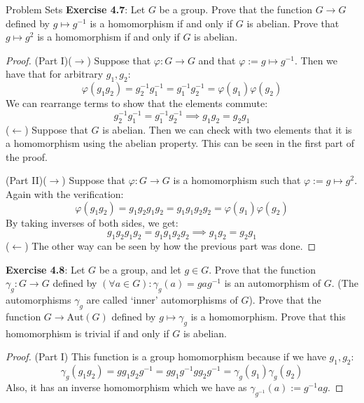 \documentclass{report}
\begin{document}
\begin{exercises}{Problem Sets}
    \textbf{Exercise 4.7}: Let $G$ be a group. Prove that the function $G \rightarrow G$ defined by $g \mapsto g^{-1}$ is a homomorphism if and only if $G$ is abelian. Prove that $g \mapsto g^{2}$ is a homomorphism if and only if $G$ is abelian.
        \begin{proof}
            (Part I)($\rightarrow $) Suppose that $\varphi : G \rightarrow G$ and that $\varphi := g \mapsto g^{-1}$. Then we have that for arbitrary $g_{1}, g_{2}$:
                \begin{equation*}
                    \varphi(g_{1}g_{2}) = g_{2}^{-1}g_{1}^{-1} = g_{1}^{-1}g_{2}^{-1} = \varphi(g_{1})\varphi(g_{2})
                \end{equation*}
            We can rearrange terms to show that the elements commute:
                \begin{equation*}
                    g_{2}^{-1}g_{1}^{-1} = g_{1}^{-1}g_{2}^{-1} \implies g_{1}g_{2} = g_{2}g_{1}
                \end{equation*}
            ($\leftarrow $) Suppose that $G$ is abelian. Then we can check with two elements that it is a homomorphism using the abelian property. This can be seen in the first part of the proof.

            (Part II)($\rightarrow $) Suppose that $\varphi : G \rightarrow G$ is a homomorphism such that $\varphi := g \mapsto g^{2}$. Again with the verification:
                \begin{equation*}
                    \varphi(g_{1}g_{2}) = g_{1}g_{2}g_{1}g_{2} = g_{1}g_{1}g_{2}g_{2} = \varphi(g_{1})\varphi(g_{2})
                \end{equation*}
            By taking inverses of both sides, we get:
                \begin{equation*}
                    g_{1}g_{2}g_{1}g_{2} = g_{1}g_{1}g_{2}g_{2} \implies g_{1}g_{2} = g_{2}g_{1}
                \end{equation*}
            ($\leftarrow $) The other way can be seen by how the previous part was done.
        \end{proof}

    \textbf{Exercise 4.8}: Let $G$ be a group, and let $g \in G$. Prove that the function $\gamma_{g} : G \rightarrow G$ defined by $(\forall a \in G) : \gamma_{g}(a) = gag^{-1}$ is an automorphism of $G$. (The automorphisms $\gamma_{g}$ are called `inner' automorphisms of $G$). Prove that the function $G \rightarrow \text{Aut}(G)$ defined by $g \mapsto \gamma_{g}$ is a homomorphism. Prove that this homomorphism is trivial if and only if $G$ is abelian.
        \begin{proof}
            (Part I) This function is a group homomorphism because if we have $g_{1}, g_{2}$:
                \begin{equation*}
                    \gamma_{g}(g_{1}g_{2}) = gg_{1}g_{2}g^{-1} = gg_{1}g^{-1}gg_{2}g^{-1} = \gamma_{g}(g_{1})\gamma_{g}(g_{2})
                \end{equation*}
            Also, it has an inverse homomorphism which we have as $\gamma_{g^{-1}}(a) := g^{-1}ag$.


\end{proof}
\end{exercises}
\end{document}
